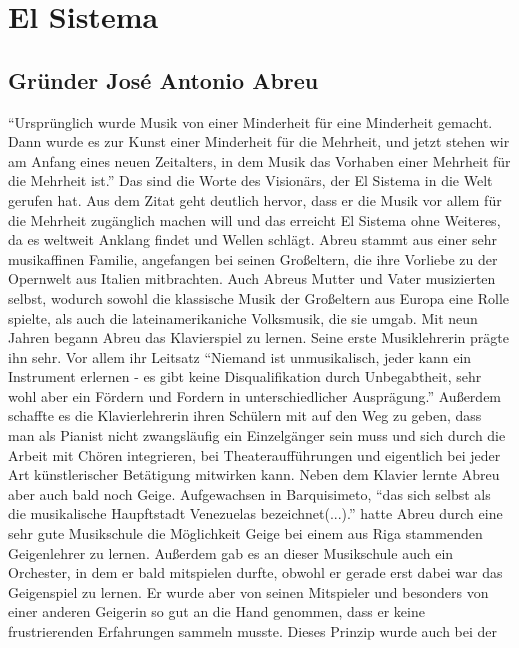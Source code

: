 \section{El Sistema}

\subsection{Gründer José Antonio Abreu}
\enquote{Ursprünglich wurde Musik von einer Minderheit für eine Minderheit
gemacht. Dann wurde es zur Kunst einer Minderheit für die Mehrheit, und jetzt
stehen wir am Anfang eines neuen Zeitalters, in dem Musik das Vorhaben einer
Mehrheit für die Mehrheit ist.} \autocite[5]{kaufmann:el_sistema} Das sind die
Worte des Visionärs, der El Sistema in die Welt gerufen hat. Aus dem Zitat geht
deutlich hervor, dass er die Musik vor allem für die Mehrheit zugänglich machen
will und das erreicht El Sistema ohne Weiteres, da es weltweit Anklang findet
und Wellen schlägt. Abreu stammt aus einer sehr musikaffinen
Familie, angefangen bei seinen Großeltern, die ihre Vorliebe zu der Opernwelt
aus Italien mitbrachten. Auch Abreus Mutter und Vater musizierten selbst, wodurch
sowohl die klassische Musik der Großeltern aus Europa eine Rolle spielte, als
auch die lateinamerikaniche Volksmusik, die sie umgab. Mit neun Jahren begann
Abreu das Klavierspiel zu lernen. Seine erste Musiklehrerin prägte ihn sehr. Vor
allem ihr Leitsatz \enquote{Niemand ist unmusikalisch, jeder kann ein Instrument
erlernen - es gibt keine Disqualifikation durch Unbegabtheit, sehr wohl aber ein
Fördern und Fordern in unterschiedlicher Ausprägung.}
\autocite[20]{kaufmann:el_sistema} Außerdem schaffte es die Klavierlehrerin
ihren Schülern mit auf den Weg zu geben, dass man als Pianist nicht zwangsläufig
ein Einzelgänger sein muss und sich durch die Arbeit mit Chören integrieren, bei
Theateraufführungen und eigentlich bei jeder Art künstlerischer Betätigung
mitwirken kann. Neben dem Klavier lernte Abreu aber auch bald noch Geige.
Aufgewachsen in Barquisimeto, \enquote{das sich selbst als die musikalische
Haupftstadt Venezuelas bezeichnet(...).} \autocite[22]{kaufmann:el_sistema}
hatte Abreu durch eine sehr gute Musikschule die Möglichkeit Geige bei einem aus
Riga stammenden Geigenlehrer zu lernen. Außerdem gab es an dieser Musikschule
auch ein Orchester, in dem er bald mitspielen durfte, obwohl er gerade erst
dabei war das Geigenspiel zu lernen. Er wurde aber von seinen Mitspieler und
besonders von einer anderen Geigerin so gut an die Hand genommen, dass er keine
frustrierenden Erfahrungen sammeln musste. Dieses Prinzip wurde auch bei der
